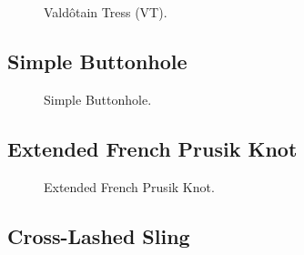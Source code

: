 \begin{figure}[H]\centering
	\begin{minipage}{1\linewidth}
		\begin{center}
			\tcbox[enhanced jigsaw,colframe=black,opacityframe=0.5,opacityback=0.5]
			{\centering{}}
		\end{center}
	\end{minipage}
\caption{Valdôtain Tress (VT).}
\label{ris:VT}
\end{figure}

\subsection{Simple Buttonhole}

\begin{figure}[H]\centering
	\begin{minipage}{1\linewidth}
		\begin{center}
			\tcbox[enhanced jigsaw,colframe=black,opacityframe=0.5,opacityback=0.5]
			{\centering{}}
		\end{center}
	\end{minipage}
\caption{Simple Buttonhole.}
\label{ris:Simple_Buttonhole}
\end{figure}

\subsection{Extended French Prusik Knot}

\begin{figure}[H]\centering
	\begin{minipage}{1\linewidth}
		\begin{center}
			\tcbox[enhanced jigsaw,colframe=black,opacityframe=0.5,opacityback=0.5]
			{\centering{}}
		\end{center}
	\end{minipage}
\caption{Extended French Prusik Knot.}
\label{ris:Extended_French_Prusik_Knot}
\end{figure}

\subsection{Cross-Lashed Sling}


